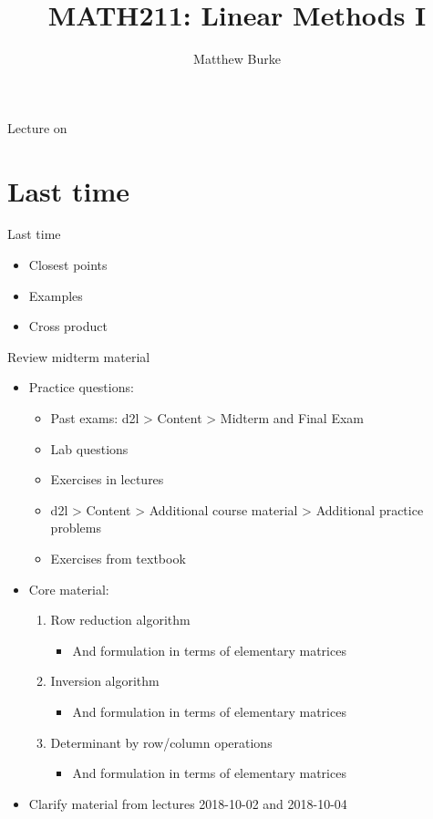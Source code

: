 \documentclass{beamer}
\title{MATH211: Linear Methods I}
\author{Matthew Burke}
\date{\lectureDate}
\newcommand{\lectureDate}{\formatdate{23}{10}{2018}}
\begin{document}
\frame{\titlepage}

\begin{frame}{Lecture on \lectureDate}
  \tableofcontents
\end{frame}

\section*{Last time}
\label{sec:Last-time}

\begin{frame}{Last time}
  \begin{itemize}
  \item Closest points\vfill
  \item Examples\vfill
  \item Cross product
  \end{itemize}
\end{frame}

\begin{frame}{Review midterm material}
\begin{itemize}
  \item Practice questions:
  \begin{itemize}
    \item Past exams: d2l > Content > Midterm and Final Exam
    \item Lab questions
    \item Exercises in lectures
    \item d2l > Content > Additional course material > Additional practice problems
    \item Exercises from textbook
  \end{itemize}
  \item Core material:
  \begin{enumerate}
    \item Row reduction algorithm
    \begin{itemize}
      \item And formulation in terms of elementary matrices
    \end{itemize}
    \item Inversion algorithm
    \begin{itemize}
      \item And formulation in terms of elementary matrices
    \end{itemize}
    \item Determinant by row/column operations
    \begin{itemize}
      \item And formulation in terms of elementary matrices
    \end{itemize}
  \end{enumerate}
	\item Clarify material from lectures 2018-10-02 and 2018-10-04
\end{itemize}
\end{frame}
\end{document}
